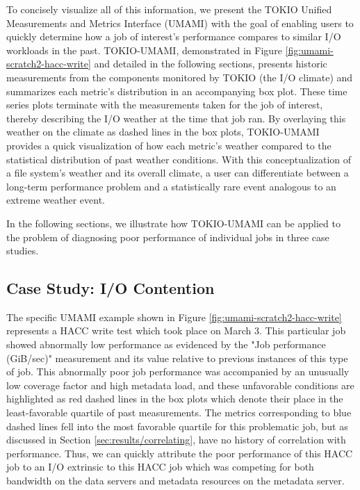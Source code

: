 To concisely visualize all of this information, we present the TOKIO Unified Measurements and Metrics Interface (UMAMI) with the goal of enabling users to quickly determine how a job of interest's performance compares to similar I/O workloads in the past.
TOKIO-UMAMI, demonstrated in Figure \ref{fig:umami-scratch2-hacc-write} and detailed in the following sections, presents historic measurements from the components monitored by TOKIO (the I/O climate) and summarizes each metric's distribution in an accompanying box plot.
These time series plots terminate with the measurements taken for the job of interest, thereby describing the I/O weather at the time that job ran.
By overlaying this weather on the climate as dashed lines in the box plots, TOKIO-UMAMI provides a quick visualization of how each metric's weather compared to the statistical distribution of past weather conditions.
With this conceptualization of a file system's weather and its overall climate, a user can differentiate between a long-term performance problem and a statistically rare event analogous to an extreme weather event.

In the following sections, we illustrate how TOKIO-UMAMI can be applied to the problem of diagnosing poor performance of individual jobs in three case studies.

\subsection{Case Study: I/O Contention}

The specific UMAMI example shown in Figure \ref{fig:umami-scratch2-hacc-write} represents a HACC write test which took place on March 3.
This particular job showed abnormally low performance as evidenced by the "Job performance (GiB/sec)" measurement and its value relative to previous instances of this type of job.
This abnormally poor job performance was accompanied by an unusually low coverage factor and high metadata load, and these unfavorable conditions are highlighted as red dashed lines in the box plots which denote their place in the least-favorable quartile of past measurements.
The metrics corresponding to blue dashed lines fell into the most favorable quartile for this problematic job, but as discussed in Section \ref{sec:results/correlating}, have no history of correlation with performance.
Thus, we can quickly attribute the poor performance of this HACC job to an I/O extrinsic to this HACC job which was competing for both bandwidth on the data servers and metadata resources on the metadata server.


